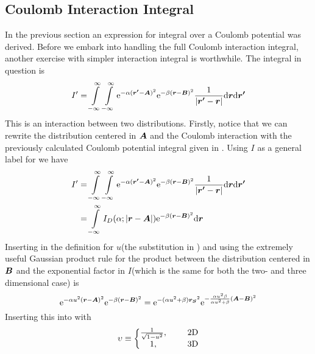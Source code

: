 \subsection{Coulomb Interaction Integral}
    In the previous section an expression for integral over a Coulomb potential
    was derived. Before we embark into handling the full Coulomb interaction
    integral, another exercise with simpler interaction integral is worthwhile.
    The integral in question is
        \begin{equation}
            I' = \int\limits^{\infty}_{-\infty}\int\limits^{\infty}_{-\infty} \mathrm{e}^{-\alpha(\boldsymbol{{r'}}-\boldsymbol{{A}})^2}
            \mathrm{e}^{-\beta(\boldsymbol{{r}}-\boldsymbol{{B}})^2} \frac{1}{\abs{\boldsymbol{{r'}} -
            \boldsymbol{{r}}}} \mathrm{d}\boldsymbol{{r}} \mathrm{d}\boldsymbol{{r'}}
            \label{eq:coulombInteractionSimple}
        \end{equation}
    This is an interaction between two distributions. Firstly, notice that we
    can rewrite the distribution centered in $\boldsymbol{{A}}$ and the Coulomb
    interaction with the previously calculated Coulomb potential integral given
    in . Using $I$ as a general label for
     we have
        \begin{align}
            I' &= \int\limits^{\infty}_{-\infty}\int\limits^{\infty}_{-\infty} \mathrm{e}^{-\alpha(\boldsymbol{{r'}}-\boldsymbol{{A}})^2}
            \mathrm{e}^{-\beta(\boldsymbol{{r}}-\boldsymbol{{B}})^2} \frac{1}{\abs{\boldsymbol{{r'}} -
            \boldsymbol{{r}}}} \mathrm{d}\boldsymbol{{r}} \mathrm{d}\boldsymbol{{r'}} \nonumber \\
            &= \int\limits^{\infty}_{-\infty} I_D(\alpha;\abs{\boldsymbol{{r}}-\boldsymbol{{A}}}) \mathrm{e}^{-\beta(\boldsymbol{{r}}
            - \boldsymbol{{B}})^2} \mathrm{d}\boldsymbol{{r}}
            \label{eq:Cintr1}
        \end{align}
    Inserting in the definition for $u$(the substitution in )
    and using the extremely useful Gaussian product rule for the product
    between the distribution centered in $\boldsymbol{{B}}$ and the exponential factor
    in $I$(which is the same for both the two- and three dimensional case) is
        \begin{equation}
            \mathrm{e}^{-\alpha u^2(\boldsymbol{{r}}-\boldsymbol{{A}})^2} \mathrm{e}^{-\beta(\boldsymbol{{r}} -
            \boldsymbol{{B}})^2} = \mathrm{e}^{-(\alpha u^2 + \beta)\boldsymbol{{r_S}}^2}
            \mathrm{e}^{-\frac{\alpha u^2\beta}{\alpha u^2 + \beta}
            (\boldsymbol{{A}}-\boldsymbol{{B}})^2}
        \end{equation}
    Inserting this into  with
        \begin{equation}
            \upsilon \equiv \left\{
                \begin{matrix}
                    \frac{1}{\sqrt{1-u^2}},&\indent \text{2D} \\
                    1,&\indent \text{3D}
                \end{matrix}\right.
        \end{equation}
